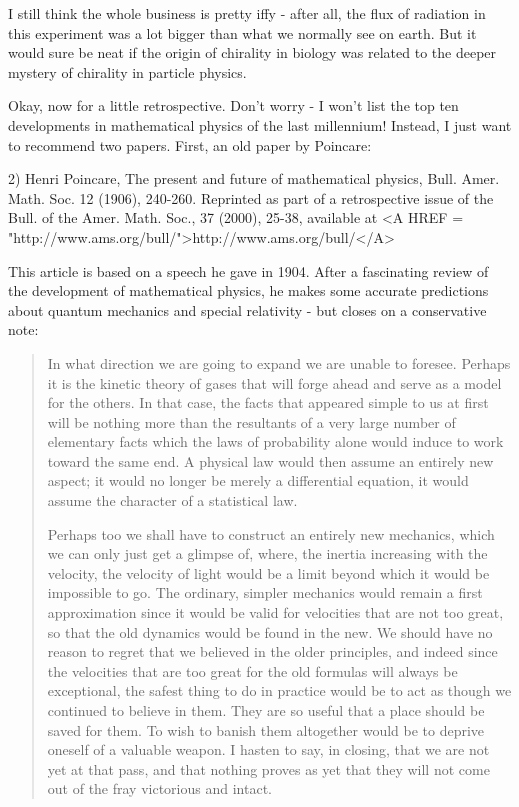 I still think the whole business is pretty iffy - after all, the flux of
radiation in this experiment was a lot bigger than what we normally see
on earth.  But it would sure be neat if the origin of chirality in
biology was related to the deeper mystery of chirality in particle physics.

Okay, now for a little retrospective.  Don't worry - I won't list the
top ten developments in mathematical physics of the last millennium!
Instead, I just want to recommend two papers.  First, an old paper by 
Poincare: 

2) Henri Poincare, The present and future of mathematical physics,
Bull. Amer. Math. Soc. 12 (1906), 240-260.  Reprinted as part of a
retrospective issue of the Bull. of the Amer. Math. Soc., 37 (2000), 
25-38, available 
at <A HREF = "http://www.ams.org/bull/">http://www.ams.org/bull/</A>

This article is based on a speech he gave in 1904.   After a
fascinating review of the development of mathematical physics, 
he makes some accurate predictions about quantum mechanics and 
special relativity - but closes on a conservative note: 

\begin{quote}
     In what direction we are going to expand we are unable to foresee.  
     Perhaps it is the kinetic theory of gases that will forge ahead 
     and serve as a model for the others.  In that case, the facts  
     that appeared simple to us at first will be nothing more than
     the resultants of a very large number of elementary facts which 
     the laws of probability alone would induce to work toward the 
     same end.  A physical law would then assume an entirely new aspect; 
     it would no longer be merely a differential equation, it would 
     assume the character of a statistical law. 

     Perhaps too we shall have to construct an entirely new mechanics, 
     which we can only just get a glimpse of, where, the inertia 
     increasing with the velocity, the velocity of light would be a 
     limit beyond which it would be impossible to go. The ordinary, 
     simpler mechanics would remain a first approximation since it 
     would be valid for velocities that are not too great, so that 
     the old dynamics would be found in the new.  We should have no 
     reason to regret that we believed in the older principles, and 
     indeed since the velocities that are too great for the old 
     formulas will always be exceptional, the safest thing to do in 
     practice would be to act as though we continued to believe in 
     them.  They are so useful that a place should be saved for them. 
     To wish to banish them altogether would be to deprive oneself of 
     a valuable weapon. I hasten to say, in closing, that we are not 
     yet at that pass, and that nothing proves as yet that they will 
     not come out of the fray victorious and intact.

\end{quote}
    
